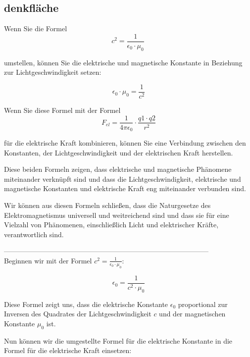 \documentclass{report}
\begin{document}
\clearpage
\subsection{denkfläche}
Wenn Sie die Formel 
\begin{equation}
c^2 = \frac{1}{\epsilon_0 \cdot \mu_0}\
  \label{eq:wasdklfj}
\end{equation}

umstellen, können
Sie die elektrische und magnetische Konstante in Beziehung zur
Lichtgeschwindigkeit setzen:

\begin{equation}
\epsilon_0 \cdot \mu_0 = \frac{1}{c^2}
  \label{eq:weis-nicht}
\end{equation}


Wenn Sie diese Formel mit der Formel 
\begin{equation}
F_{el} = \frac{1}{4\pi \epsilon_0} \cdot \frac{q1 \cdot q2}{r^2}
\end{equation}

für die elektrische Kraft kombinieren, können Sie eine
Verbindung zwischen den Konstanten, der Lichtgeschwindigkeit und der
elektrischen Kraft herstellen.

Diese beiden Formeln zeigen, dass elektrische und magnetische Phänomene
miteinander verknüpft sind und dass die Lichtgeschwindigkeit, elektrische und
magnetische Konstanten und elektrische Kraft eng miteinander verbunden sind.

Wir können aus diesen Formeln schließen, dass die Naturgesetze des
Elektromagnetismus universell und weitreichend sind und dass sie für eine
Vielzahl von Phänomenen, einschließlich Licht und elektrischer Kräfte,
verantwortlich sind.

–––––––––––––––––––––––––––––––––––––––––––––––––––––––––––\\
Beginnen wir mit der Formel $c^2 = \frac{1}{\epsilon_0 \cdot \mu_0}$:

\begin{equation}
\epsilon_0 = \frac{1}{c^2 \cdot \mu_0}
\end{equation}


Diese Formel zeigt uns, dass die elektrische Konstante $\epsilon_0$ proportional zur
Inversen des Quadrates der Lichtgeschwindigkeit $c$ und der magnetischen
Konstante $\mu_0$ ist.

Nun können wir die umgestellte Formel für die elektrische Konstante in die
Formel für die elektrische Kraft einsetzen:
\end{document}
